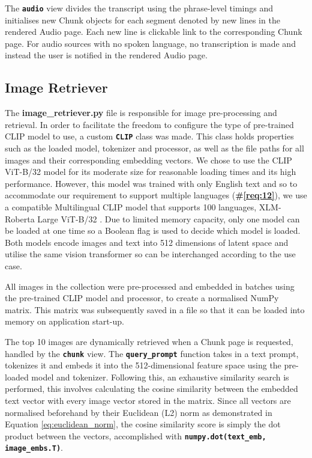 \documentclass{l4proj}
\begin{document}
The \textbf{\lstinline|audio|} view divides the transcript using the phrase-level timings and initialises new Chunk objects for each segment denoted by new lines in the rendered Audio page. Each new line is clickable link to the corresponding Chunk page. For audio sources with no spoken language, no transcription is made and instead the user is notified in the rendered Audio page.


\subsection{Image Retriever}
The \textbf{image\_retriever.py} file is responsible for image pre-processing and retrieval. In order to facilitate the freedom to configure the type of pre-trained CLIP model to use, a custom \textbf{\lstinline{CLIP}} class was made. This class holds properties such as the loaded model, tokenizer and processor, as well as the file paths for all images and their corresponding embedding vectors. We chose to use the CLIP ViT-B/32 model for its moderate size for reasonable loading times and its high performance. However, this model was trained with only English text and so to accommodate our requirement to support multiple languages (\textbf{\#\ref{req:12}}), we use a compatible Multilingual CLIP model that supports 100 languages, XLM-Roberta Large ViT-B/32 \citep{mclip}. Due to limited memory capacity, only one model can be loaded at one time so a Boolean flag is used to decide which model is loaded. Both models encode images and text into 512 dimensions of latent space and utilise the same vision transformer so can be interchanged according to the use case.

All images in the collection were pre-processed and embedded in batches using the pre-trained CLIP model and processor, to create a normalised NumPy matrix. This matrix was subsequently saved in a file so that it can be loaded into memory on application start-up. 

\label{sec:image_retriever:par:query_prompt}
The top 10 images are dynamically retrieved when a Chunk page is requested, handled by the \textbf{\lstinline{chunk}} view. The \textbf{\lstinline{query_prompt}} function takes in a text prompt, tokenizes it and embeds it into the 512-dimensional feature space using the pre-loaded model and tokenizer. Following this, an exhaustive similarity search is performed, this involves calculating the cosine similarity between the embedded text vector with every image vector stored in the matrix. Since all vectors are normalised beforehand by their Euclidean (L2) norm as demonstrated in Equation \ref{eq:euclidean_norm}, the cosine similarity score is simply the dot product between the vectors, accomplished with \textbf{\lstinline{numpy.dot(text_emb, image_embs.T)}}. 
\end{document}
